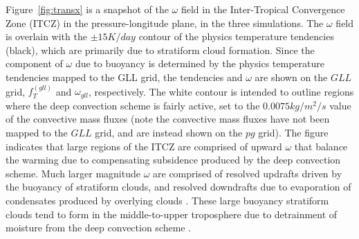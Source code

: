\documentclass{agujournal}
\begin{document}
Figure~\ref{fig:transx} is a snapshot of the $\omega$ field in the Inter-Tropical Convergence Zone (ITCZ) in the pressure-longitude plane, in the three simulations. The $\omega$ field is overlain with the $\pm 15 K/day$ contour of the physics temperature tendencies (black), which are primarily due to stratiform cloud formation. Since the component of $\omega$ due to buoyancy is determined by the physics temperature tendencies mapped to the GLL grid, the tendencies and $\omega$ are shown on the $GLL$ grid, $f_T^{(gll)}$ and $\omega_{gll}$, respectively. The white contour is intended to outline regions where the deep convection scheme is fairly active, set to the $0.0075 kg/m^2/s$ value of the convective mass fluxes (note the convective mass fluxes have not been mapped to the $GLL$ grid, and are instead shown on the $pg$ grid). The figure indicates that large regions of the ITCZ are comprised of upward $\omega$ that balance the warming due to compensating subsidence produced by the deep convection scheme. Much larger magnitude $\omega$ are comprised of resolved updrafts driven by the buoyancy of stratiform clouds, and resolved downdrafts due to evaporation of condensates produced by overlying clouds \citep{HR2018JAMES}. These large buoyancy stratiform clouds tend to form in the middle-to-upper troposphere due to detrainment of moisture from the deep convection scheme \citep{ZM1995AO}. 
\end{document}
